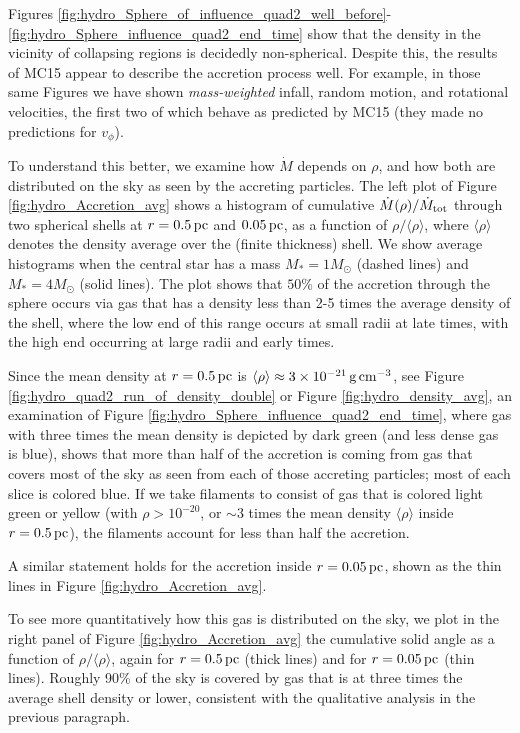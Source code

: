 \documentclass[../dissertation.tex]{subfiles}
\begin{document}
Figures 
\ref{fig:hydro_Sphere_of_influence_quad2_well_before}-\ref{fig:hydro_Sphere_influence_quad2_end_time} 
show that the density in the vicinity of collapsing regions
is decidedly non-spherical. Despite this, the results of MC15 appear to describe the 
accretion process well. For example, in those same Figures we have shown {\em mass-weighted} 
infall, random motion, and rotational velocities, the first two of which behave as predicted by
MC15 (they made no predictions for $v_\phi$). 

To understand this better, we examine how $\dot M$ depends on $\rho$, and how both
are distributed on the sky as seen by the accreting particles.
The left plot of Figure \ref{fig:hydro_Accretion_avg} shows a histogram of 
cumulative $\dot{M}(\rho)/\dot M_{\rm tot}$ through two spherical shells
at $r = 0.5 \,\rm pc$ and $0.05 \,\rm pc$, 
as a function of $\rho/\langle \rho\rangle$, where $\langle\rho\rangle$ 
denotes the density average over the (finite thickness) shell. 
We show average histograms when the central star has a mass $M_*=1M_\odot$ (dashed lines)
and $M_*=4M_\odot$ (solid lines).  The plot shows that $50\%$ of the accretion through the
sphere occurs via gas that has a density less than 2-5 times the average 
density of the shell,
where the low end of this range occurs at small radii at late times, with the high
end occurring at large radii and early times.

Since the mean density at $r=0.5\,\rm pc$ is 
$\langle\rho\rangle\approx 3\times10^{-21}\,\rm g\,\rm cm^{-3}$, see 
Figure \ref{fig:hydro_quad2_run_of_density_double} or Figure \ref{fig:hydro_density_avg}, an examination of 
Figure \ref{fig:hydro_Sphere_influence_quad2_end_time}, where gas with three times the 
mean density is depicted by dark green (and less dense gas is blue), shows that more than
half of the accretion is coming from gas that covers most of the sky as seen 
from each of those accreting particles; most of each slice is colored blue. If we take 
filaments to consist of gas that is
colored light green or yellow (with $\rho>10^{-20}$, or $\sim 3$ times 
the mean density $\langle\rho\rangle$ inside $r=0.5\,\rm pc$),
the filaments account for less than half the accretion.

A similar statement holds for the accretion inside $r=0.05\,\rm pc$, shown as the thin lines in Figure 
\ref{fig:hydro_Accretion_avg}.

To see more quantitatively how this gas is distributed on the sky,
we plot in the right panel of Figure \ref{fig:hydro_Accretion_avg} the cumulative solid 
angle as a function of $\rho/\langle \rho\rangle$, again for $r=0.5\,\rm pc$ (thick lines) 
and for $r=0.05\,\rm pc$ (thin lines).  Roughly 90\% of the sky is
covered by gas that is at three times the average shell density or lower, 
consistent with the qualitative analysis in the previous paragraph. 
\end{document}
